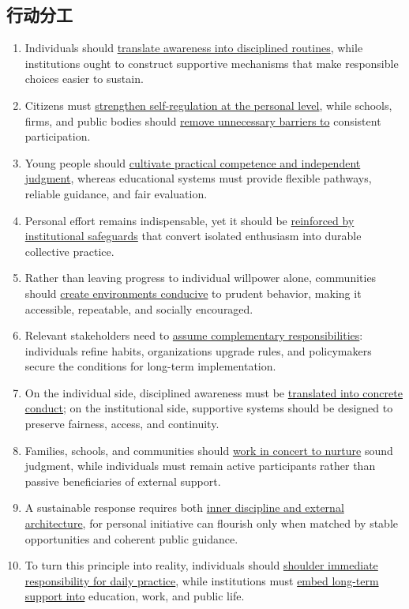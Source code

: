 \subsection{行动分工}

\begin{enumerate}
    \item Individuals should \underline{translate awareness into disciplined routines}, while institutions ought to construct supportive mechanisms that make responsible choices easier to sustain.

    \item Citizens must \underline{strengthen self-regulation at the personal level}, while schools, firms, and public bodies should \underline{remove unnecessary barriers to} consistent participation.

    \item Young people should \underline{cultivate practical competence and independent judgment}, whereas educational systems must provide flexible pathways, reliable guidance, and fair evaluation.

    \item Personal effort remains indispensable, yet it should be \underline{reinforced by institutional safeguards} that convert isolated enthusiasm into durable collective practice.

    \item Rather than leaving progress to individual willpower alone, communities should \underline{create environments conducive} to prudent behavior, making it accessible, repeatable, and socially encouraged.

    \item Relevant stakeholders need to \underline{assume complementary responsibilities}: individuals refine habits, organizations upgrade rules, and policymakers secure the conditions for long-term implementation.

    \item On the individual side, disciplined awareness must be \underline{translated into concrete conduct}; on the institutional side, supportive systems should be designed to preserve fairness, access, and continuity.

    \item Families, schools, and communities should \underline{work in concert to nurture} sound judgment, while individuals must remain active participants rather than passive beneficiaries of external support.

    \item A sustainable response requires both \underline{inner discipline and external architecture}, for personal initiative can flourish only when matched by stable opportunities and coherent public guidance.

    \item To turn this principle into reality, individuals should \underline{shoulder immediate responsibility for daily practice}, while institutions must \underline{embed long-term support into} education, work, and public life.
\end{enumerate}

